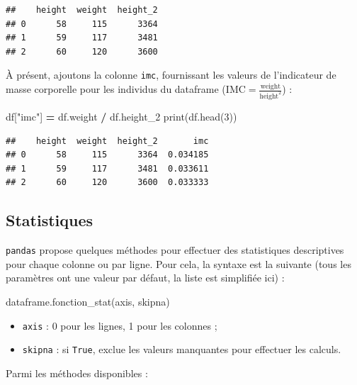 \documentclass[
  12pt,
]{book}
\newenvironment{Shaded}{\begin{snugshade}}{\end{snugshade}}
\newcommand{\BuiltInTok}[1]{#1}
\newcommand{\DecValTok}[1]{\textcolor[rgb]{0.00,0.00,0.81}{#1}}
\newcommand{\NormalTok}[1]{#1}
\newcommand{\OperatorTok}[1]{\textcolor[rgb]{0.81,0.36,0.00}{\textbf{#1}}}
\newcommand{\StringTok}[1]{\textcolor[rgb]{0.31,0.60,0.02}{#1}}
\providecommand{\tightlist}{%
  \setlength{\itemsep}{0pt}\setlength{\parskip}{0pt}}
\numberwithin{equation}{section}
\numberwithin{countremarque}{section}
\begin{document}
\begin{lstlisting}
##    height  weight  height_2
## 0      58     115      3364
## 1      59     117      3481
## 2      60     120      3600
\end{lstlisting}

À présent, ajoutons la colonne \texttt{imc}, fournissant les valeurs de l'indicateur de masse corporelle pour les individus du dataframe (\(\text{IMC} = \frac{\text{weight}}{\text{height}^2}\)) :

\begin{Shaded}
\begin{Highlighting}[]
\NormalTok{df[}\StringTok{"imc"}\NormalTok{] }\OperatorTok{=}\NormalTok{ df.weight }\OperatorTok{/}\NormalTok{ df.height\_2}
\BuiltInTok{print}\NormalTok{(df.head(}\DecValTok{3}\NormalTok{))}
\end{Highlighting}
\end{Shaded}

\begin{lstlisting}
##    height  weight  height_2       imc
## 0      58     115      3364  0.034185
## 1      59     117      3481  0.033611
## 2      60     120      3600  0.033333
\end{lstlisting}

\subsection{Statistiques}\label{pandas-statistiques-df}

\texttt{pandas} propose quelques méthodes pour effectuer des statistiques descriptives pour chaque colonne ou par ligne. Pour cela, la syntaxe est la suivante (tous les paramètres ont une valeur par défaut, la liste est simplifiée ici) :

\begin{Shaded}
\begin{Highlighting}[]
\NormalTok{dataframe.fonction\_stat(axis, skipna)}
\end{Highlighting}
\end{Shaded}

\begin{itemize}
\tightlist
\item
  \texttt{axis} : 0 pour les lignes, 1 pour les colonnes ;
\item
  \texttt{skipna} : si \texttt{True}, exclue les valeurs manquantes pour effectuer les calculs.
\end{itemize}

Parmi les méthodes disponibles :
\end{document}
